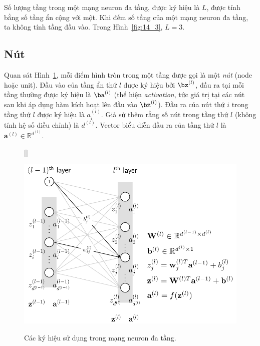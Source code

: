 
Số lượng tầng trong một mạng neuron đa tầng, được ký hiệu là $L$, được
tính bằng số tầng ẩn cộng với một. Khi đếm số tầng của một
mạng neuron đa tầng, ta không tính tầng đầu vào. Trong Hình~\ref{fig:14_3}, $L = 3$.
 
\subsection{Nút}
Quan sát Hình~\ref{fig:14_4}, mỗi điểm hình tròn trong một tầng được
gọi là một \textit{nút} (node hoặc unit). Đầu vào của tầng ẩn thứ $l$ được ký hiệu bởi $\bz^{(l)}$, đầu ra tại mỗi tầng thường được ký
hiệu là $\ba^{(l)}$ (thể hiện \textit{activation}, tức giá trị tại các nút sau
khi áp dụng hàm kích hoạt lên đầu vào $\bz^{(l)}$). Đầu ra của nút
thứ $i$ trong tầng thứ $l$ được ký hiệu là $a_i^{(l)}$. Giả sử thêm rằng số
nút trong tầng thứ $l$ (không tính hệ số điều chỉnh) là $d^{(l)}$. Vector biểu diễn đầu ra
của tầng thứ $l$ là $\mathbf{a}^{(l)} \in \mathbb{R}^{d^{(l)}}$.
 
 
 
\begin{figure}[t]
    [\FBwidth]
    {\caption{ 
    Các ký hiệu sử dụng trong mạng neuron đa tầng.
    }
    \label{fig:14_4}}
    { %
    \includegraphics[width=.6\textwidth]{Chapters/05_NeuralNetworks/14_mlp/latex/mlp_notation.pdf}
    }
\end{figure}

 
